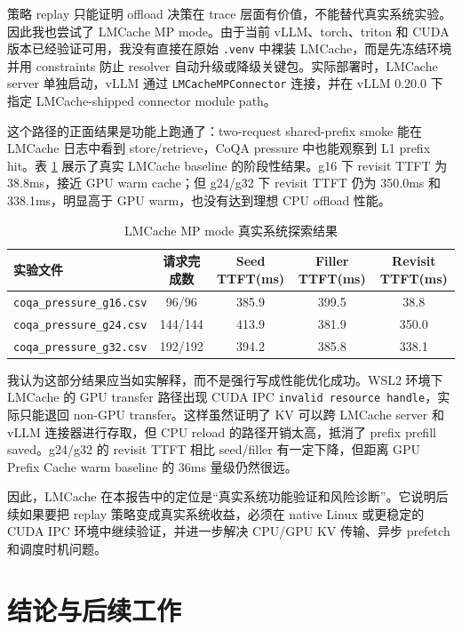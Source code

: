 \documentclass[UTF8,a4paper,10pt]{ctexart}
\begin{document}
策略 replay 只能证明 offload 决策在 trace 层面有价值，不能替代真实系统实验。因此我也尝试了 LMCache MP mode。由于当前 vLLM、torch、triton 和 CUDA 版本已经验证可用，我没有直接在原始 \texttt{.venv} 中裸装 LMCache，而是先冻结环境并用 constraints 防止 resolver 自动升级或降级关键包。实际部署时，LMCache server 单独启动，vLLM 通过 \texttt{LMCacheMPConnector} 连接，并在 vLLM 0.20.0 下指定 LMCache-shipped connector module path。

这个路径的正面结果是功能上跑通了：two-request shared-prefix smoke 能在 LMCache 日志中看到 store/retrieve，CoQA pressure 中也能观察到 L1 prefix hit。表 \ref{tab:lmcache} 展示了真实 LMCache baseline 的阶段性结果。g16 下 revisit TTFT 为 38.8ms，接近 GPU warm cache；但 g24/g32 下 revisit TTFT 仍为 350.0ms 和 338.1ms，明显高于 GPU warm，也没有达到理想 CPU offload 性能。

\begin{table}[H]
\centering
\small
\caption{LMCache MP mode 真实系统探索结果}
\label{tab:lmcache}
\begin{tabular}{lcccc}
\toprule
实验文件 & 请求完成数 & Seed TTFT(ms) & Filler TTFT(ms) & Revisit TTFT(ms) \\
\midrule
\texttt{coqa\_pressure\_g16.csv} & 96/96  & 385.9 & 399.5 & 38.8 \\
\texttt{coqa\_pressure\_g24.csv} & 144/144 & 413.9 & 381.9 & 350.0 \\
\texttt{coqa\_pressure\_g32.csv} & 192/192 & 394.2 & 385.8 & 338.1 \\
\bottomrule
\end{tabular}
\end{table}

我认为这部分结果应当如实解释，而不是强行写成性能优化成功。WSL2 环境下 LMCache 的 GPU transfer 路径出现 CUDA IPC \texttt{invalid resource handle}，实际只能退回 non-GPU transfer。这样虽然证明了 KV 可以跨 LMCache server 和 vLLM 连接器进行存取，但 CPU reload 的路径开销太高，抵消了 prefix prefill saved。g24/g32 的 revisit TTFT 相比 seed/filler 有一定下降，但距离 GPU Prefix Cache warm baseline 的 36ms 量级仍然很远。

因此，LMCache 在本报告中的定位是“真实系统功能验证和风险诊断”。它说明后续如果要把 replay 策略变成真实系统收益，必须在 native Linux 或更稳定的 CUDA IPC 环境中继续验证，并进一步解决 CPU/GPU KV 传输、异步 prefetch 和调度时机问题。

\section{结论与后续工作}
\end{document}
